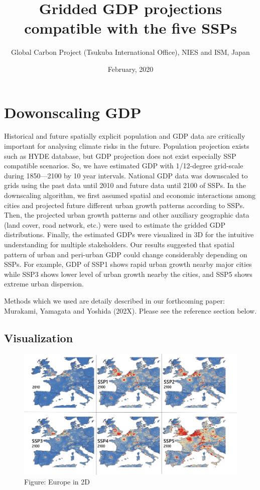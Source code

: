 \documentclass[]{book}
\title{Gridded GDP projections compatible with the five SSPs}
\author{Global Carbon Project (Tsukuba International Office), NIES and ISM, Japan}
\date{February, 2020}
\begin{document}
\maketitle

{
\setcounter{tocdepth}{1}
\tableofcontents
}
\hypertarget{dowonscaling-gdp}{%
\chapter{Dowonscaling GDP}\label{dowonscaling-gdp}}

Historical and future spatially explicit population and GDP data are critically important for analysing climate risks in the future. Population projection exists such as HYDE database, but GDP projection does not exist especially SSP compatible scenarios. So, we have estimated GDP with 1/12-degree grid-scale during 1850---2100 by 10 year intervals. National GDP data was downscaled to grids using the past data until 2010 and future data until 2100 of SSPs. In the downscaling algorithm, we first assumed spatial and economic interactions among cities and projected future different urban growth patterns according to SSPs. Then, the projected urban growth patterns and other auxiliary geographic data (land cover, road network, etc.) were used to estimate the gridded GDP distributions. Finally, the estimated GDPs were visualized in 3D for the intuitive understanding for multiple stakeholders. Our results suggested that spatial pattern of urban and peri-urban GDP could change considerably depending on SSPs. For example, GDP of SSP1 shows rapid urban growth nearby major cities while SSP3 shows lower level of urban growth nearby the cities, and SSP5 shows extreme urban dispersion.

Methods which we used are detaily described in our forthcoming paper: Murakami, Yamagata and Yoshida (202X). Please see the reference section below.

\hypertarget{visualization}{%
\section{Visualization}\label{visualization}}

\begin{figure}
\centering
\includegraphics{Europe.png}
\caption{Figure: Europe in 2D}
\end{figure}
\end{document}
